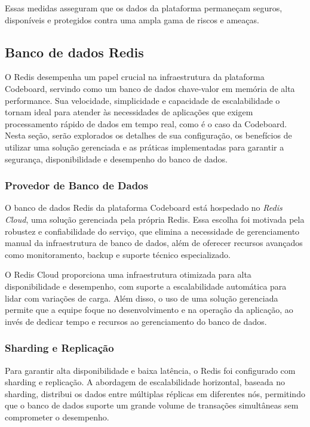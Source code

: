 Essas medidas asseguram que os dados da plataforma permaneçam seguros, disponíveis e protegidos contra uma ampla gama de riscos e ameaças.

\subsection{Banco de dados Redis}

O Redis desempenha um papel crucial na infraestrutura da plataforma Codeboard, servindo como um banco de dados chave-valor em memória de alta performance. Sua velocidade, simplicidade e capacidade de escalabilidade o tornam ideal para atender às necessidades de aplicações que exigem processamento rápido de dados em tempo real, como é o caso da Codeboard. Nesta seção, serão explorados os detalhes de sua configuração, os benefícios de utilizar uma solução gerenciada e as práticas implementadas para garantir a segurança, disponibilidade e desempenho do banco de dados.

\subsubsection{Provedor de Banco de Dados}

O banco de dados Redis da plataforma Codeboard está hospedado no \emph{Redis Cloud}, uma solução gerenciada pela própria Redis. Essa escolha foi motivada pela robustez e confiabilidade do serviço, que elimina a necessidade de gerenciamento manual da infraestrutura de banco de dados, além de oferecer recursos avançados como monitoramento, backup e suporte técnico especializado.

O Redis Cloud proporciona uma infraestrutura otimizada para alta disponibilidade e desempenho, com suporte a escalabilidade automática para lidar com variações de carga. Além disso, o uso de uma solução gerenciada permite que a equipe foque no desenvolvimento e na operação da aplicação, ao invés de dedicar tempo e recursos ao gerenciamento do banco de dados.

\subsubsection{Sharding e Replicação}

Para garantir alta disponibilidade e baixa latência, o Redis foi configurado com sharding e replicação. A abordagem de escalabilidade horizontal, baseada no sharding, distribui os dados entre múltiplas réplicas em diferentes nós, permitindo que o banco de dados suporte um grande volume de transações simultâneas sem comprometer o desempenho.

